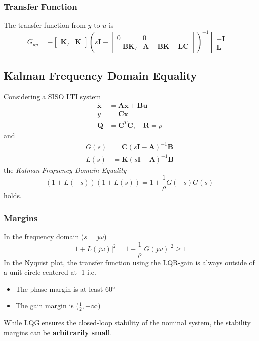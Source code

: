 \subsubsection{Transfer Function}

The transfer function from $y$ to $u$ is
\begin{equation*}
    G_{uy} = -\begin{bmatrix}
        \mathbf{K}_I & \mathbf{K}
    \end{bmatrix}
    {\left(s\mathbf{I}-\begin{bmatrix}
        0              & 0                \\
        \mathbf{-BK}_I & \mathbf{A-BK-LC}
    \end{bmatrix}\right)}^{-1}
    \begin{bmatrix}
        \mathbf{-I} \\
        \mathbf{L}
    \end{bmatrix}
\end{equation*}



\subsection{Kalman Frequency Domain Equality}
Considering a SISO LTI system
\noindent\begin{align*}
    \dot{\mathbf{x}} &= \mathbf{Ax} + \mathbf{Bu}\\
    y &= \mathbf{Cx} \\
    \mathbf{Q} &= \mathbf{C}^T \mathbf{C}, \quad \mathbf{R}=\rho
\end{align*}
and 
\noindent\begin{align*}
    G(s) &= \mathbf{C}(s \mathbf{I}-\mathbf{A})^{-1}\mathbf{B}\\
    L(s) &= \mathbf{K}(s \mathbf{I}-\mathbf{A})^{-1}\mathbf{B}
\end{align*}
the \textit{Kalman Frequency Domain Equality}
\noindent\begin{equation*}
    (1+L(-s))(1+L(s)) = 1+\frac{1}{\rho}G(-s)G(s)
\end{equation*}
holds.

\subsubsection{Margins}

In the frequency domain ($s=j\omega$)
\noindent\begin{equation*}
    \left|1+L(j\omega)\right|^2=1+\frac1\rho\left|G(j\omega)\right|^2\geq1
\end{equation*}
In the Nyquist plot, the transfer function using the LQR-gain is always outside of a unit circle centered at -1 i.e.
\begin{itemize}
    \item The phase margin is at least 60°
    \item The gain margin is ($\frac{1}{2}, +\infty$)
\end{itemize}


While LQG ensures the closed-loop stability of the nominal system, the stability margins can be \textbf{arbitrarily small}.

